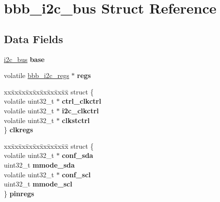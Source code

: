 \hypertarget{structbbb__i2c__bus}{}\section{bbb\+\_\+i2c\+\_\+bus Struct Reference}
\label{structbbb__i2c__bus}
\subsection*{Data Fields}
\begin{DoxyCompactItemize}
\item 
\mbox{\label{structbbb__i2c__bus_ac252790d199a90621dd5307f979ac7d2}} 
\mbox{\hyperlink{structi2c__bus}{i2c\+\_\+bus}} {\bfseries base}
\item 
\mbox{\label{structbbb__i2c__bus_a0702dab80d4b41743849b053e0fb0742}} 
volatile \mbox{\hyperlink{structi2c__regs}{bbb\+\_\+i2c\+\_\+regs}} $\ast$ {\bfseries regs}
\item 
\mbox{\label{structbbb__i2c__bus_aba30825b524114e6dcc920a9606a8665}} 
\begin{tabbing}
xx\=xx\=xx\=xx\=xx\=xx\=xx\=xx\=xx\=\kill
struct \{\\
\>volatile uint32\_t $\ast$ {\bfseries ctrl\_clkctrl}\\
\>volatile uint32\_t $\ast$ {\bfseries i2c\_clkctrl}\\
\>volatile uint32\_t $\ast$ {\bfseries clkstctrl}\\
\} {\bfseries clkregs}\\

\end{tabbing}\item 
\mbox{\label{structbbb__i2c__bus_aa006f3053646a63d6b3560ff192b133f}} 
\begin{tabbing}
xx\=xx\=xx\=xx\=xx\=xx\=xx\=xx\=xx\=\kill
struct \{\\
\>volatile uint32\_t $\ast$ {\bfseries conf\_sda}\\
\>uint32\_t {\bfseries mmode\_sda}\\
\>volatile uint32\_t $\ast$ {\bfseries conf\_scl}\\
\>uint32\_t {\bfseries mmode\_scl}\\
\} {\bfseries pinregs}\\


\end{tabbing}
\end{DoxyCompactItemize}

